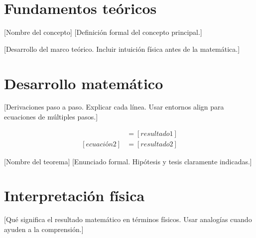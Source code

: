 \section{Fundamentos teóricos}
\label{sec:[etiqueta]-fundamentos}

\begin{definicion}{[Nombre del concepto]}
  [Definición formal del concepto principal.]
\end{definicion}

[Desarrollo del marco teórico. Incluir intuición física antes de la matemática.]


\section{Desarrollo matemático}
\label{sec:[etiqueta]-matematica}

[Derivaciones paso a paso. Explicar cada línea. Usar entornos align para
ecuaciones de múltiples pasos.]

\begin{align}
  [ecuación 1] &= [resultado 1] \label{eq:[etiqueta]-1} \\
  [ecuación 2] &= [resultado 2] \label{eq:[etiqueta]-2}
\end{align}

\begin{teorema}{[Nombre del teorema]}
  [Enunciado formal. Hipótesis y tesis claramente indicadas.]
\end{teorema}

\section{Interpretación física}
\label{sec:[etiqueta]-interpretacion}

[Qué significa el resultado matemático en términos físicos. Usar analogías
cuando ayuden a la comprensión.]

\begin{observacion}
\end{observacion}

